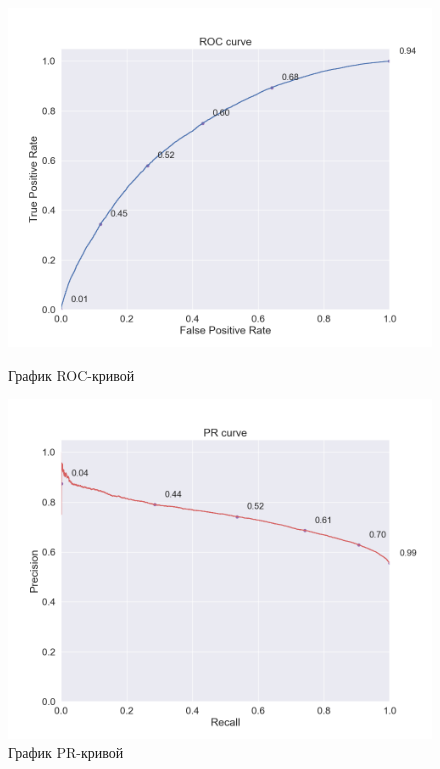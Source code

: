 \begin{figure}[h!]
\centering
\begin{minipage}{.5\textwidth}
\centering
\includegraphics[width=1.1\linewidth]{images/mixed_memory_based/roc_curve}
\caption{График ROC-кривой}
\label{fig:memory_based_roc}
\end{minipage}%
\begin{minipage}{.5\textwidth}
\centering
\includegraphics[width=1.1\linewidth]{images/mixed_memory_based/pr_curve}
\caption{График PR-кривой}
\label{fig:memory_based_pr}
\end{minipage}
\end{figure}


